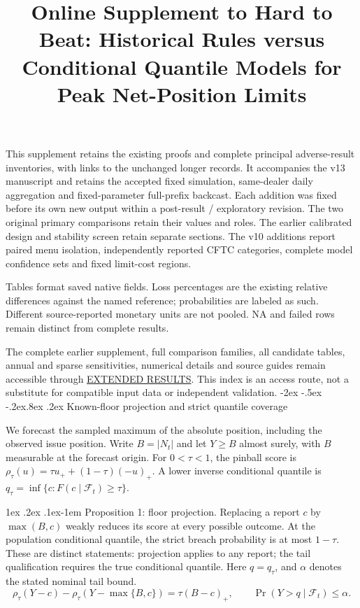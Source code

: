 \documentclass[10pt,a4paper]{article}
\title{Online Supplement to Hard to Beat: Historical Rules versus Conditional Quantile Models for Peak Net-Position Limits}
\author{}
\date{}
\makeatletter
\renewcommand\section{\@startsection{section}{1}{\z@}%
  {-2ex \@plus -.5ex \@minus -.2ex}{.8ex \@plus .2ex}%
  {\normalfont\large\bfseries}}
\renewcommand\paragraph{\@startsection{paragraph}{4}{\z@}%
  {1ex \@plus .2ex \@minus .1ex}{-1em}%
  {\normalfont\normalsize\bfseries}}
\makeatother
\begin{document}
\maketitle
This supplement retains the existing proofs and complete principal adverse-result
inventories, with links to the unchanged longer records. It accompanies the
v13 manuscript and retains the accepted fixed simulation, same-dealer daily
aggregation and fixed-parameter full-prefix backcast. Each addition was fixed
before its own new output within a post-result / exploratory revision. The
two original primary comparisons retain their values and roles.
The earlier calibrated design and stability screen retain separate sections. The v10 additions report paired menu isolation, independently reported CFTC categories, complete model confidence sets and fixed limit-cost regions.

Tables format saved native fields. Loss percentages are the existing relative
differences against the named reference; probabilities are labeled as such.
Different source-reported monetary units are not pooled. NA and failed rows
remain distinct from complete results.

The complete earlier supplement, full comparison families, all candidate
tables, annual and sparse sensitivities, numerical details and source guides
remain accessible through \href{https://github.com/ByronLi0207/financial-mathematics-paper-20261020/blob/revision-v7-final/EXTENDED_RESULTS.md}{EXTENDED RESULTS}.
This index is an access route, not a substitute for compatible input data or
independent validation.
\begingroup
\small
\setlength{\parskip}{0pt}
\setcounter{tocdepth}{1}
\makeatletter
\renewcommand*\l@section[2]{\@dottedtocline{1}{0em}{2.5em}{#1}{#2}}
\makeatother
\tableofcontents
\endgroup
\medskip
\section{Known-floor projection and strict quantile coverage}\label{sup:floor}

We forecast the sampled maximum of the absolute position, including
the observed issue position. Write \(B=|N_t|\) and let \(Y\ge B\) almost surely,
with \(B\) measurable at the forecast origin. For \(0<\tau<1\), the pinball score is
\(\rho_\tau(u)=\tau u_+ +(1-\tau)(-u)_+\). A lower inverse conditional quantile
is \(q_\tau=\inf\{c:F(c\mid\mathcal F_t)\ge\tau\}\).

\paragraph{Proposition 1: floor projection.}
Replacing a report \(c\) by \(\max(B,c)\) weakly reduces its score at every possible
outcome. At the population conditional quantile, the strict breach probability
is at most \(1-\tau\). These are distinct statements: projection applies to any
report; the tail qualification requires the true conditional quantile.
Here \(q=q_\tau\), and \(\alpha\) denotes the stated nominal tail bound.
\[
\rho_\tau(Y-c)-\rho_\tau(Y-\max\{B,c\})=\tau(B-c)_+,\qquad \Pr(Y>q\mid\mathcal F_t)\le\alpha.
\]
\end{document}
